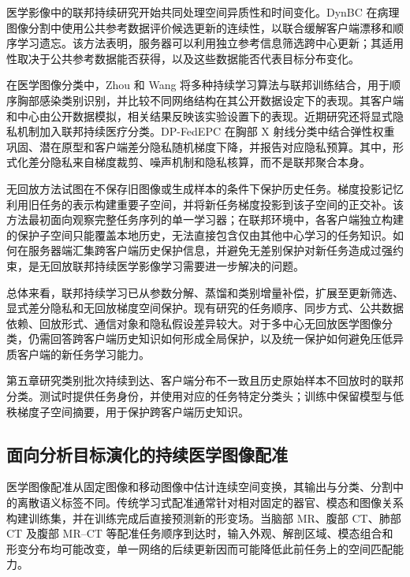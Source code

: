 医学影像中的联邦持续研究开始共同处理空间异质性和时间变化。DynBC 在病理图像分割中使用公共参考数据评价候选更新的连续性，以联合缓解客户端漂移和顺序学习遗忘\cite{babendererde2025dynbc}。该方法表明，服务器可以利用独立参考信息筛选跨中心更新；其适用性取决于公共参考数据能否获得，以及这些数据能否代表目标分布变化。

在医学图像分类中，Zhou 和 Wang 将多种持续学习算法与联邦训练结合，用于顺序胸部感染类别识别，并比较不同网络结构在其公开数据设定下的表现\cite{zhou2025thoracicfcl}。其客户端和中心由公开数据模拟，相关结果反映该实验设置下的表现。近期研究还将显式隐私机制加入联邦持续医疗分类。DP-FedEPC 在胸部 X 射线分类中结合弹性权重巩固、潜在原型和客户端差分隐私随机梯度下降，并报告对应隐私预算\cite{sinhal2026dpfedepc}。其中，形式化差分隐私来自梯度裁剪、噪声机制和隐私核算，而不是联邦聚合本身。

无回放方法试图在不保存旧图像或生成样本的条件下保护历史任务。梯度投影记忆利用旧任务的表示构建重要子空间，并将新任务梯度投影到该子空间的正交补\cite{saha2021gpm}。该方法最初面向观察完整任务序列的单一学习器；在联邦环境中，各客户端独立构建的保护子空间只能覆盖本地历史，无法直接包含仅由其他中心学习的任务知识。如何在服务器端汇集跨客户端历史保护信息，并避免无差别保护对新任务造成过强约束，是无回放联邦持续医学影像学习需要进一步解决的问题。

总体来看，联邦持续学习已从参数分解、蒸馏和类别增量补偿，扩展至更新筛选、显式差分隐私和无回放梯度空间保护。现有研究的任务顺序、同步方式、公共数据依赖、回放形式、通信对象和隐私假设差异较大。对于多中心无回放医学图像分类，仍需回答跨客户端历史知识如何形成全局保护，以及统一保护如何避免压低异质客户端的新任务学习能力。

第五章研究类别批次持续到达、客户端分布不一致且历史原始样本不回放时的联邦分类。测试时提供任务身份，并使用对应的任务特定分类头；训练中保留模型与低秩梯度子空间摘要，用于保护跨客户端历史知识。

\subsection{面向分析目标演化的持续医学图像配准}
\label{subsec:intro-registration-cl}

医学图像配准从固定图像和移动图像中估计连续空间变换，其输出与分类、分割中的离散语义标签不同。传统学习式配准通常针对相对固定的器官、模态和图像关系构建训练集，并在训练完成后直接预测新的形变场\cite{balakrishnan2019voxelmorph}。当脑部 MR、腹部 CT、肺部 CT 及腹部 MR--CT 等配准任务顺序到达时，输入外观、解剖区域、模态组合和形变分布均可能改变，单一网络的后续更新因而可能降低此前任务上的空间匹配能力\cite{wang2024samcl}。

